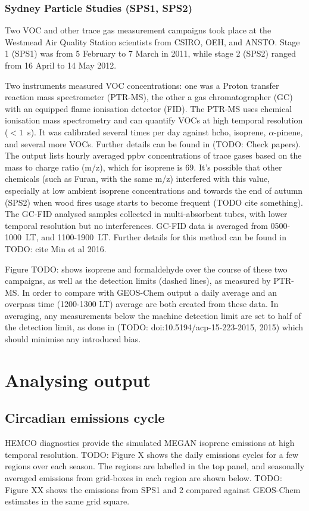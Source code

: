   \subsubsection{Sydney Particle Studies (SPS1, SPS2)}
    \label{Model:Datasets:SPS}
    Two VOC and other trace gas measurement campaigns took place at the Westmead Air Quality Station scientists from CSIRO, OEH, and ANSTO. 
    Stage 1 (SPS1) was from 5 February to 7 March in 2011, while stage 2 (SPS2) ranged from 16 April to 14 May 2012.
    
    Two instruments measured VOC concentrations: one was a Proton transfer reaction mass spectrometer (PTR-MS), the other a gas chromatographer (GC) with an equipped flame ionisation detector (FID).
    The PTR-MS uses chemical ionisation mass spectrometry and can quantify VOCs at high temporal resolution ($< 1$~s).
    It was calibrated several times per day against hcho, isoprene, $\alpha$-pinene, and several more VOCs. Further details can be found in \cite{Dunne2012,Dunne2017} (TODO: Check papers).
    The output lists hourly averaged ppbv concentrations of trace gases based on the mass to charge ratio (m/z), which for isoprene is 69.
    It's possible that other chemicals (such as Furan, with the same m/z) interfered with this value, especially at low ambient isoprene concentrations and towards the end of autumn (SPS2) when wood fires usage starts to become frequent (TODO cite something).
    The GC-FID analysed samples collected in multi-absorbent tubes, with lower temporal resolution but no interferences. GC-FID data is averaged from 0500-1000~LT, and 1100-1900~LT. Further details for this method can be found in TODO: cite Min et al 2016.
    
    Figure TODO: shows isoprene and formaldehyde over the course of these two campaigns, as well as the detection limits (dashed lines), as measured by PTR-MS. In order to compare with GEOS-Chem output a daily average and an overpass time (1200-1300 LT) average are both created from these data.
    In averaging, any measurements below the machine detection limit are set to half of the detection limit, as done in (TODO: doi:10.5194/acp-15-223-2015, 2015) which should minimise any introduced bias.

\section{Analysing output}
\label{Model:Analysis}
  
  \subsection{Circadian emissions cycle}
    HEMCO diagnostics provide the simulated MEGAN isoprene emissions at high temporal resolution.
    TODO: Figure X shows the daily emissions cycles for a few regions over each season. 
    The regions are labelled in the top panel, and seasonally averaged emissions from grid-boxes in each region are shown below.
    TODO: Figure XX shows the emissions from SPS1 and 2 compared against GEOS-Chem estimates in the same grid square.
    
